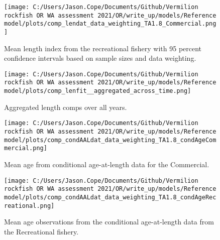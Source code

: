 \documentclass[11pt,
  english,
  a4paper,
]{article}
\begin{document}
\tagmcend\tagstructend


\begin{figure}
\centering
\texttt{[image: C:/Users/Jason.Cope/Documents/Github/Vermilion rockfish OR WA assessment 2021/OR/write\_up/models/Reference model/plots/comp\_lendat\_data\_weighting\_TA1.8\_Commercial.png]}
\caption{Mean length index from the recreational fishery with 95 percent confidence intervals based on sample sizes and data weighting.\label{fig:rec-mean-len-fit}}
\end{figure}

\tagmcend\tagstructend


\begin{figure}
\centering
\texttt{[image: C:/Users/Jason.Cope/Documents/Github/Vermilion rockfish OR WA assessment 2021/OR/write\_up/models/Reference model/plots/comp\_lenfit\_\_aggregated\_across\_time.png]}
\caption{Aggregated length comps over all years.\label{fig:agg-len-fit}}
\end{figure}

\tagmcend\tagstructend


\begin{figure}
\centering
\texttt{[image: C:/Users/Jason.Cope/Documents/Github/Vermilion rockfish OR WA assessment 2021/OR/write\_up/models/Reference model/plots/comp\_condAALdat\_data\_weighting\_TA1.8\_condAgeCommercial.png]}
\caption{Mean age from conditional age-at-length data for the Commercial.\label{fig:com-mean-caal}}
\end{figure}

\tagmcend\tagstructend


\begin{figure}
\centering
\texttt{[image: C:/Users/Jason.Cope/Documents/Github/Vermilion rockfish OR WA assessment 2021/OR/write\_up/models/Reference model/plots/comp\_condAALdat\_data\_weighting\_TA1.8\_condAgeRecreational.png]}
\caption{Mean age observations from the conditional age-at-length data from the Recreational fishery.\label{fig:rec-mean-caal}}
\end{figure}
\end{document}
